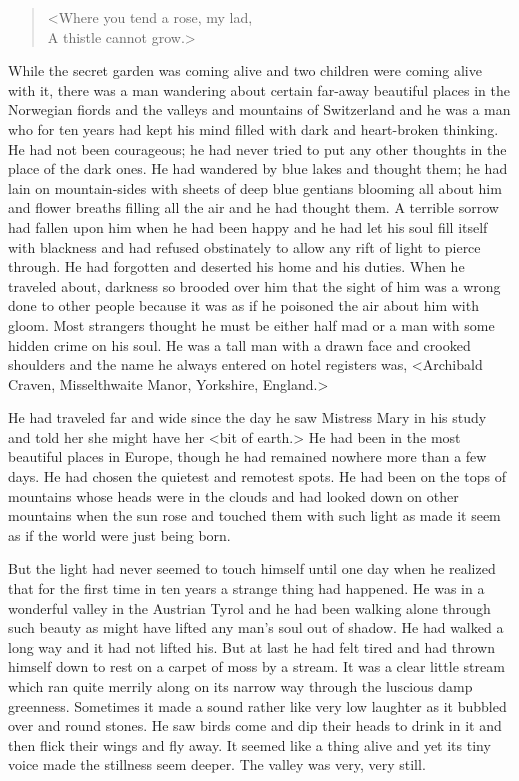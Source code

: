 \begin{verse}
<Where you tend a rose, my lad,\\
A thistle cannot grow.>
\end{verse}

While the secret garden was coming alive and two children were coming alive with it, there was a man wandering about certain far-away beautiful places in the Norwegian fiords and the valleys and mountains of Switzerland and he was a man who for ten years had kept his mind filled with dark and heart-broken thinking. He had not been courageous; he had never tried to put any other thoughts in the place of the dark ones. He had wandered by blue lakes and thought them; he had lain on mountain-sides with sheets of deep blue gentians blooming all about him and flower breaths filling all the air and he had thought them. A terrible sorrow had fallen upon him when he had been happy and he had let his soul fill itself with blackness and had refused obstinately to allow any rift of light to pierce through. He had forgotten and deserted his home and his duties. When he traveled about, darkness so brooded over him that the sight of him was a wrong done to other people because it was as if he poisoned the air about him with gloom. Most strangers thought he must be either half mad or a man with some hidden crime on his soul. He was a tall man with a drawn face and crooked shoulders and the name he always entered on hotel registers was, <Archibald Craven, Misselthwaite Manor, Yorkshire, England.>

He had traveled far and wide since the day he saw Mistress Mary in his study and told her she might have her <bit of earth.> He had been in the most beautiful places in Europe, though he had remained nowhere more than a few days. He had chosen the quietest and remotest spots. He had been on the tops of mountains whose heads were in the clouds and had looked down on other mountains when the sun rose and touched them with such light as made it seem as if the world were just being born.

But the light had never seemed to touch himself until one day when he realized that for the first time in ten years a strange thing had happened. He was in a wonderful valley in the Austrian Tyrol and he had been walking alone through such beauty as might have lifted any man's soul out of shadow. He had walked a long way and it had not lifted his. But at last he had felt tired and had thrown himself down to rest on a carpet of moss by a stream. It was a clear little stream which ran quite merrily along on its narrow way through the luscious damp greenness. Sometimes it made a sound rather like very low laughter as it bubbled over and round stones. He saw birds come and dip their heads to drink in it and then flick their wings and fly away. It seemed like a thing alive and yet its tiny voice made the stillness seem deeper. The valley was very, very still.

